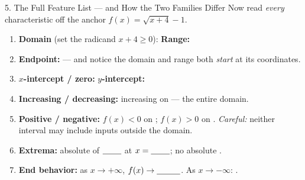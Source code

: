 \documentclass[10pt]{article}
\newcommand{\lgrid}[4]{%
  \draw[step=1, linegray!40, very thin] (#1,#3) grid (#2,#4);
  \draw[->, semithick, charcoal] (#1,0)--(#2,0) node[below right, font=\scriptsize]{$x$};
  \draw[->, semithick, charcoal] (0,#3)--(0,#4) node[left, font=\scriptsize]{$y$};}
\begin{document}
\begin{notesbox}{5. The Full Feature List --- and How the Two Families Differ}
Now read \emph{every} characteristic off the anchor $f(x)=\sqrt{x+4}-1$.
\begin{center}
\end{center}
\begin{enumerate}[leftmargin=1.7em, itemsep=3pt]
  \item \textbf{Domain} (set the radicand $x+4\ge 0$): \blank{3.4cm} \quad \textbf{Range:}
        \blank{3.4cm}
  \item \textbf{Endpoint:} \blank{1.8cm} --- and notice the domain and range both \emph{start} at
        its coordinates.
  \item \textbf{$x$-intercept / zero:} \blank{1.8cm} \quad \textbf{$y$-intercept:} \blank{1.8cm}
  \item \textbf{Increasing / decreasing:} increasing on \blank{3.0cm} --- the entire domain.
  \item \textbf{Positive / negative:} $f(x)<0$ on \blank{2.6cm}; \quad $f(x)>0$ on \blank{2.6cm}.
        \emph{Careful:} neither interval may include inputs outside the domain.
  \item \textbf{Extrema:} absolute \blank{1.6cm} of $\blank{0.8cm}$ at $x=\blank{0.8cm}$; no
        absolute \blank{1.6cm}.
  \item \textbf{End behavior:} as $x\to+\infty$, $f(x)\to\blank{1.0cm}$. \; As $x\to-\infty$:
        \blank{4.4cm}.
\end{enumerate}


\end{notesbox}
\end{document}
